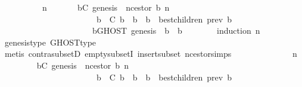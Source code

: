 \begin{isabellebody}
\ \ \isamarkupfalse%
\ {\isacharminus}\isanewline
\ \ \ \ \isamarkupfalse%
\ n\isanewline
\ \ \ \ \isamarkupfalse%
\ {\isachardoublequoteopen}{\isasymforall}{\isasymsigma}{\isasymin}{\isasymSigma}{\isachardot}\ {\isasymforall}b{\isasymin}C{\isachardot}\ genesis\ {\isacharequal}\ n{\isacharunderscore}cestor\ {\isacharparenleft}b{\isacharcomma}\ n{\isacharparenright}\ {\isasymand}\isanewline
\ \ \ \ \ \ \ \ \ \ \ \ \ \ \ \ \ \ \ \ \ \ {\isacharparenleft}{\isasymforall}\ b{\isacharprime}\ {\isasymin}\ C{\isachardot}\ b{\isacharprime}\ {\isasymdownharpoonright}\ b\ {\isasymlongrightarrow}\ b{\isacharprime}\ {\isasymin}\ best{\isacharunderscore}children\ {\isacharparenleft}prev\ b{\isacharprime}{\isacharcomma}\ {\isasymsigma}{\isacharparenright}{\isacharparenright}\ {\isasymlongrightarrow}\isanewline
\ \ \ \ \ \ \ \ \ \ \ \ \ \ \ \ \ \ \ \ \ \ {\isacharparenleft}{\isasymforall}b{\isacharprime}{\isacharprime}{\isasymin}GHOST\ {\isacharparenleft}{\isacharbraceleft}genesis{\isacharbraceright}{\isacharcomma}\ {\isasymsigma}{\isacharparenright}{\isachardot}\ b\ {\isasymdownharpoonright}\ b{\isacharprime}{\isacharprime}{\isacharparenright}{\isachardoublequoteclose}\isanewline
\ \ \ \ \ \ \isamarkupfalse%
\ {\isacharparenleft}induction\ n{\isacharparenright}\ \isanewline
\ \ \ \ \ \ \isamarkupfalse%
\ genesis{\isacharunderscore}type\ GHOST{\isacharunderscore}type\isanewline
\ \ \ \ \ \ \isamarkupfalse%
\ {\isacharparenleft}metis\ contra{\isacharunderscore}subsetD\ empty{\isacharunderscore}subsetI\ insert{\isacharunderscore}subset\ n{\isacharunderscore}cestor{\isachardot}simps{\isacharparenleft}{}{\isacharparenright}{\isacharparenright}\isanewline
\ \ \ \ \isamarkupfalse%
\ {\isacharminus}\isanewline
\ \ \ \ \ \ \isamarkupfalse%
\ n\isanewline
\ \ \ \ \ \ \isamarkupfalse%
\ {\isachardoublequoteopen}{\isasymforall}{\isasymsigma}{\isasymin}{\isasymSigma}{\isachardot}\ {\isasymforall}b{\isasymin}C{\isachardot}\ genesis\ {\isacharequal}\ n{\isacharunderscore}cestor\ {\isacharparenleft}b{\isacharcomma}\ n{\isacharparenright}\ {\isasymand}\isanewline
\ \ \ \ \ \ \ \ \ \ \ \ \ \ \ \ \ \ \ \ \ \ {\isacharparenleft}{\isasymforall}\ b{\isacharprime}\ {\isasymin}\ C{\isachardot}\ b{\isacharprime}\ {\isasymdownharpoonright}\ b\ {\isasymlongrightarrow}\ b{\isacharprime}\ {\isasymin}\ best{\isacharunderscore}children\ {\isacharparenleft}prev\ b{\isacharprime}{\isacharcomma}\ {\isasymsigma}{\isacharparenright}{\isacharparenright}\ {\isasymlongrightarrow}\isanewline

\end{isabellebody}
